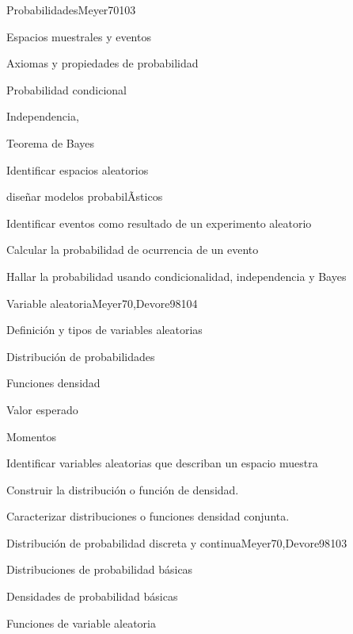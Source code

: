 \begin{syllabus}
\begin{unit}{Probabilidades}{Meyer70}{10}{3}
\begin{topics}
      \item Espacios muestrales y eventos
      \item Axiomas y propiedades de probabilidad
      \item Probabilidad condicional
      \item Independencia,
      \item Teorema de Bayes
   \end{topics}
   \begin{unitgoals}
      \item Identificar espacios aleatorios
      \item diseñar  modelos probabilÃ­sticos
      \item Identificar eventos como resultado de un experimento aleatorio
      \item Calcular la probabilidad de ocurrencia de un evento
      \item Hallar la probabilidad usando condicionalidad, independencia y Bayes
   \end{unitgoals}
\end{unit}

\begin{unit}{Variable aleatoria}{Meyer70,Devore98}{10}{4}
\begin{topics}
      \item Definición y tipos de variables aleatorias
      \item Distribución de probabilidades
      \item Funciones densidad
      \item Valor esperado
      \item Momentos
   \end{topics}

   \begin{unitgoals}
      \item Identificar variables aleatorias que describan un espacio muestra
      \item Construir la distribución o función de densidad.
      \item Caracterizar distribuciones o funciones densidad conjunta.
   \end{unitgoals}
\end{unit}

\begin{unit}{Distribución de probabilidad discreta y continua}{Meyer70,Devore98}{10}{3}
\begin{topics}
      \item Distribuciones de probabilidad básicas
      \item Densidades de probabilidad básicas
      \item Funciones de variable aleatoria
   \end{topics}


\end{unit}
\end{syllabus}
